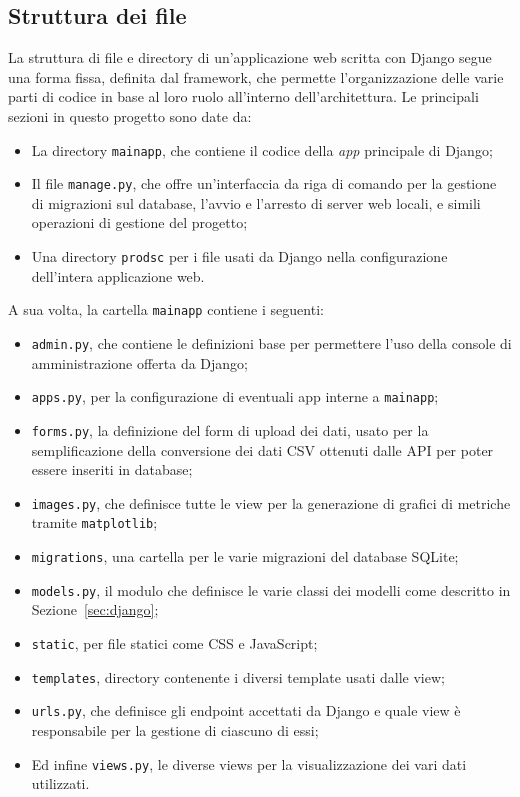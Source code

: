 \subsection{Struttura dei file}


La struttura di file e directory di un'applicazione web scritta con Django 
segue una forma fissa, definita dal framework, che permette l'organizzazione
delle varie parti di codice in base al loro ruolo all'interno dell'architettura.
Le principali sezioni in questo progetto sono date da:
\begin{itemize}
  \item La directory \texttt{mainapp}, che contiene il codice della \textit{app}
        principale di Django;
  \item Il file \texttt{manage.py}, che offre un'interfaccia da riga di comando
        per la gestione di migrazioni sul database, l'avvio e l'arresto di server
        web locali, e simili operazioni di gestione del progetto;
  \item Una directory \texttt{prodsc} per i file usati da Django nella configurazione
        dell'intera applicazione web.
\end{itemize}

A sua volta, la cartella \texttt{mainapp} contiene i seguenti:
\begin{itemize}
  \item \texttt{admin.py}, che contiene le definizioni base per permettere l'uso
        della console di amministrazione offerta da Django;
  \item \texttt{apps.py}, per la configurazione di eventuali app interne a \texttt{mainapp};
  \item \texttt{forms.py}, la definizione del form di upload dei dati, usato per la
        semplificazione della conversione dei dati CSV ottenuti dalle API per
        poter essere inseriti in database;
  \item \texttt{images.py}, che definisce tutte le view per la generazione di
        grafici di metriche tramite \texttt{matplotlib};
  \item \texttt{migrations}, una cartella per le varie migrazioni del database SQLite;
  \item \texttt{models.py}, il modulo che definisce le varie classi dei modelli
        come descritto in Sezione~\ref{sec:django};
  \item \texttt{static}, per file statici come CSS e JavaScript;
  \item \texttt{templates}, directory contenente i diversi template usati dalle view;
  \item \texttt{urls.py}, che definisce gli endpoint accettati da Django e quale
        view è responsabile per la gestione di ciascuno di essi;
  \item Ed infine \texttt{views.py}, le diverse views per la visualizzazione
        dei vari dati utilizzati.
\end{itemize}

